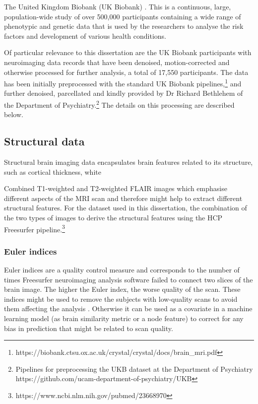 

The United Kingdom Biobank (UK Biobank) \cite{sudlow2015uk}. This is a continuous, large, population-wide study of over 500,000 participants containing a wide range of phenotypic and genetic data that is used by the researchers to analyse the risk factors and development of various health conditions. 

Of particular relevance to this dissertation are the UK Biobank participants with neuroimaging data records that have been denoised, motion-corrected and otherwise processed for further analysis, a total of 17,550 participants. The data has been initially preprocessed with the standard UK Biobank pipelines,\footnote{https://biobank.ctsu.ox.ac.uk/crystal/crystal/docs/brain_mri.pdf} and further denoised, parcellated and kindly provided by Dr Richard Bethlehem of the Department of Psychiatry.\footnote{Pipelines for preprocessing the UKB dataset at the Department of Psychiatry https://github.com/ucam-department-of-psychiatry/UKB} The details on this processing are described below.


\subsection{Structural data}
Structural brain imaging data encapsulates brain features related to its structure, such as cortical thickness, white 

Combined T1-weighted and T2-weighted FLAIR images which emphasise different aspects of the MRI scan and therefore might help to extract different structural features. For the dataset used in this dissertation, the combination of the two types of images to derive the structural features using the HCP Freesurfer pipeline.\footnote{https://www.ncbi.nlm.nih.gov/pubmed/23668970} 

\subsubsection{Euler indices}
Euler indices are a quality control measure and corresponds to the number of times Freesurfer neuroimaging analysis software failed to connect two slices of the brain image. The higher the Euler index, the worse quality of the scan. These indices might be used to remove the subjects with low-quality scans to avoid them affecting the analysis \cite{kaufmann2019}. Otherwise it can be used as a covariate in a machine learning model (as brain similarity metric or a node feature) to correct for any bias in prediction that might be related to scan quality.

